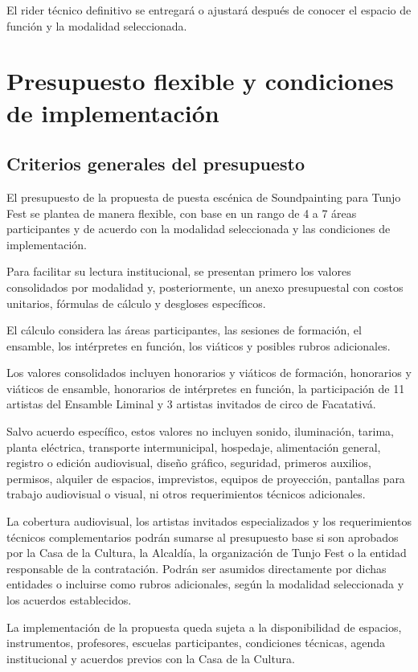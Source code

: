 \documentclass[11pt,a4paper]{article}
\newcommand{\SectionTone}{SectionBlue}
\newcommand{\setsectioncolor}[1]{\renewcommand{\SectionTone}{#1}}
\newcommand{\CurrentTOCSectionTone}{SectionBlue}
\newcommand{\settocsectioncolor}[1]{\gdef\CurrentTOCSectionTone{#1}}
\newcommand{\proposalSection}[2]{%
  \setsectioncolor{#1}%
  \addtocontents{toc}{\protect\settocsectioncolor{#1}\protect\ignorespaces}%
  \section{#2}%
}
\begin{document}
El rider técnico definitivo se entregará o ajustará después de conocer el espacio de función y la modalidad seleccionada.

\proposalSection{SectionViolet}{Presupuesto flexible y condiciones de implementación}

\subsection{Criterios generales del presupuesto}

El presupuesto de la propuesta de puesta escénica de Soundpainting para Tunjo Fest se plantea de manera flexible, con base en un rango de 4 a 7 áreas participantes y de acuerdo con la modalidad seleccionada y las condiciones de implementación.

Para facilitar su lectura institucional, se presentan primero los valores consolidados por modalidad y, posteriormente, un anexo presupuestal con costos unitarios, fórmulas de cálculo y desgloses específicos.

El cálculo considera las áreas participantes, las sesiones de formación, el ensamble, los intérpretes en función, los viáticos y posibles rubros adicionales.

Los valores consolidados incluyen honorarios y viáticos de formación, honorarios y viáticos de ensamble, honorarios de intérpretes en función, la participación de 11 artistas del Ensamble Liminal y 3 artistas invitados de circo de Facatativá.

Salvo acuerdo específico, estos valores no incluyen sonido, iluminación, tarima, planta eléctrica, transporte intermunicipal, hospedaje, alimentación general, registro o edición audiovisual, diseño gráfico, seguridad, primeros auxilios, permisos, alquiler de espacios, imprevistos, equipos de proyección, pantallas para trabajo audiovisual o visual, ni otros requerimientos técnicos adicionales.

La cobertura audiovisual, los artistas invitados especializados y los requerimientos técnicos complementarios podrán sumarse al presupuesto base si son aprobados por la Casa de la Cultura, la Alcaldía, la organización de Tunjo Fest o la entidad responsable de la contratación. Podrán ser asumidos directamente por dichas entidades o incluirse como rubros adicionales, según la modalidad seleccionada y los acuerdos establecidos.

La implementación de la propuesta queda sujeta a la disponibilidad de espacios, instrumentos, profesores, escuelas participantes, condiciones técnicas, agenda institucional y acuerdos previos con la Casa de la Cultura.
\end{document}
